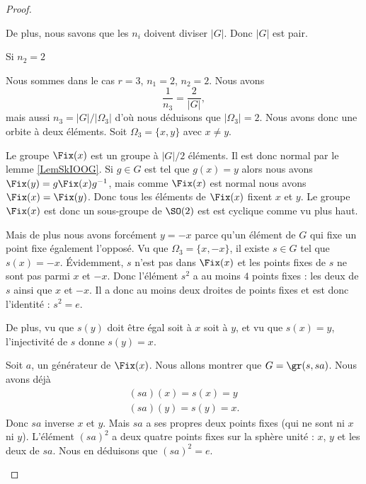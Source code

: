 \begin{proof}
\begin{subproof}
                De plus, nous savons que les \( n_i\) doivent diviser \( | G |\). Donc \( | G |\) est pair.

            \item[Si \( n_2=2\)]

                Nous sommes dans le cas \( r=3\), \( n_1=2\), \( n_2=2\). Nous avons
                \begin{equation}
                    \frac{1}{ n_3 }=\frac{ 2 }{ | G | },
                \end{equation}
                mais aussi \( n_3=| G |/| \Omega_3 |\) d'où nous déduisons que \( | \Omega_3 |=2\). Nous avons donc une orbite à deux éléments. Soit \( \Omega_3=\{ x,y \}\) avec \( x\neq y\).

                Le groupe \( \Fix(x)\) est un groupe à \( | G |/2\) éléments. Il est donc normal par le lemme \ref{LemSkIOOG}. Si \( g\in G\) est tel que \( g(x)=y\) alors nous avons \( \Fix(y)=g\Fix(x)g^{-1}\), mais comme \( \Fix(x)\) est normal nous avons \( \Fix(x)=\Fix(y)\). Donc tous les éléments de \( \Fix(x)\) fixent \( x\) et \( y\). Le groupe \( \Fix(x)\) est donc un sous-groupe de \( \SO(2)\) est est cyclique comme vu plus haut.

                Mais de plus nous avons forcément \( y=-x\) parce qu'un élément de \( G\) qui fixe un point fixe également l'opposé. Vu que \( \Omega_3=\{ x,-x \}\), il existe \( s\in G\) tel que \( s(x)=-x\). Évidemment, \( s\) n'est pas dans \( \Fix(x)\) et les points fixes de \( s\) ne sont pas parmi \( x\) et \( -x\). Donc l'élément \( s^2\) a au moins \( 4\) points fixes : les deux de \( s\) ainsi que \( x\) et \( -x\). Il a donc au moins deux droites de points fixes et est donc l'identité : \( s^2=e\).

                De plus, vu que \( s(y)\) doit être égal soit à \( x\) soit à \( y\), et vu que \( s(x)=y\), l'injectivité de \( s\) donne \( s(y)=x\).

                Soit \( a\), un générateur de \( \Fix(x)\). Nous allons montrer que \( G=\gr(s,sa)\). Nous avons déjà
                \begin{subequations}
                    \begin{align}
                        (sa)(x)=s(x)=y\\
                        (sa)(y)=s(y)=x.
                    \end{align}
                \end{subequations}
                Donc \( sa\) inverse \( x\) et \( y\). Mais \( sa\) a ses propres deux points fixes (qui ne sont ni \( x\) ni \( y\)). L'élément \( (sa)^2\) a deux quatre points fixes sur la sphère unité : \( x\), \( y\) et les deux de \( sa\). Nous en déduisons que \( (sa)^2=e\).


\end{subproof}
\end{proof}
